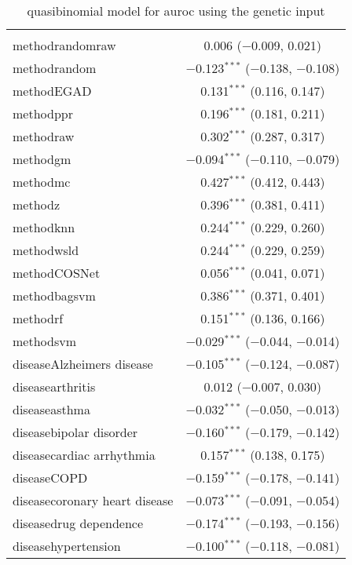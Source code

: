 
\begin{table}[!htbp] \centering 
  \caption{quasibinomial model for auroc using the genetic input} 
  \label{} 
\begin{tabular}{@{\extracolsep{5pt}}lc} 
\\[-1.8ex]\hline 
\hline \\[-1.8ex] 
 methodrandomraw & 0.006 ($-$0.009, 0.021) \\ 
  methodrandom & $-$0.123$^{***}$ ($-$0.138, $-$0.108) \\ 
  methodEGAD & 0.131$^{***}$ (0.116, 0.147) \\ 
  methodppr & 0.196$^{***}$ (0.181, 0.211) \\ 
  methodraw & 0.302$^{***}$ (0.287, 0.317) \\ 
  methodgm & $-$0.094$^{***}$ ($-$0.110, $-$0.079) \\ 
  methodmc & 0.427$^{***}$ (0.412, 0.443) \\ 
  methodz & 0.396$^{***}$ (0.381, 0.411) \\ 
  methodknn & 0.244$^{***}$ (0.229, 0.260) \\ 
  methodwsld & 0.244$^{***}$ (0.229, 0.259) \\ 
  methodCOSNet & 0.056$^{***}$ (0.041, 0.071) \\ 
  methodbagsvm & 0.386$^{***}$ (0.371, 0.401) \\ 
  methodrf & 0.151$^{***}$ (0.136, 0.166) \\ 
  methodsvm & $-$0.029$^{***}$ ($-$0.044, $-$0.014) \\ 
  diseaseAlzheimers disease & $-$0.105$^{***}$ ($-$0.124, $-$0.087) \\ 
  diseasearthritis & 0.012 ($-$0.007, 0.030) \\ 
  diseaseasthma & $-$0.032$^{***}$ ($-$0.050, $-$0.013) \\ 
  diseasebipolar disorder & $-$0.160$^{***}$ ($-$0.179, $-$0.142) \\ 
  diseasecardiac arrhythmia & 0.157$^{***}$ (0.138, 0.175) \\ 
  diseaseCOPD & $-$0.159$^{***}$ ($-$0.178, $-$0.141) \\ 
  diseasecoronary heart disease & $-$0.073$^{***}$ ($-$0.091, $-$0.054) \\ 
  diseasedrug dependence & $-$0.174$^{***}$ ($-$0.193, $-$0.156) \\ 
  diseasehypertension & $-$0.100$^{***}$ ($-$0.118, $-$0.081) \\ 

\end{tabular}
\end{table}
